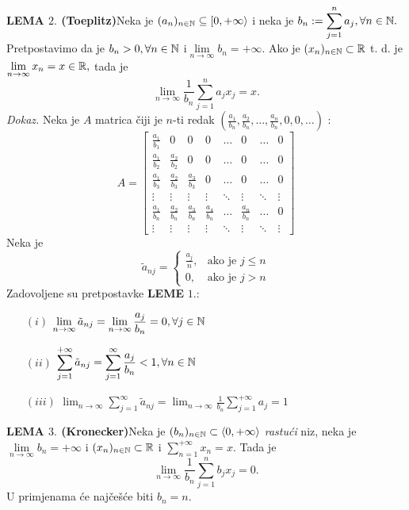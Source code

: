 \documentclass{article}
\begin{document}
\textbf{LEMA \(2.\) (Toeplitz)}\newline Neka je \((a_n)_{n\in\Bbb N}\subseteq[0,+\infty\rangle\) i neka je \(\displaystyle b_n:=\sum_{j=1}^na_j,\forall n\in\Bbb N.\) Pretpostavimo da je \(b_n>0,\forall n\in\Bbb N\) i\newline \(\lim\limits_{n\to\infty}b_n=+\infty.\) Ako je \((x_n)_{n\in\Bbb N}\subset\Bbb R\) t. d. je \(\lim\limits_{n\to\infty}x_n=x\in\Bbb R,\) tada je \[\lim_{n\to\infty}\frac1{b_n}\sum_{j=1}^na_jx_j=x.\]  
\textit{Dokaz.}\newline
Neka je \(A\) matrica čiji je \(n\)-ti redak \(\left(\frac{a_1}{b_n},\frac{a_2}{b_n},\ldots,\frac{a_n}{b_n},0,0,\ldots\right)\) : \[A=\begin{bmatrix}\frac{a_1}{b_1}&0&0&0&\ldots&0&\ldots&0\\\frac{a_1}{b_2}&\frac{a_2}{b_2}&0&0&\ldots&0&\ldots&0\\\frac{a_1}{b_3}&\frac{a_2}{b_3}&\frac{a_3}{b_3}&0&\ldots&0&\ldots&0\\\vdots&\vdots&\vdots&\vdots&\ddots&\vdots&\ddots&\vdots\\\frac{a_1}{b_n}&\frac{a_2}{b_n}&\frac{a_3}{b_n}&\frac{a_4}{b_n}&\ldots&\frac{a_n}{b_n}&\ldots&0\\\vdots&\vdots&\vdots&\vdots&\ddots&\vdots&\ddots&\vdots\end{bmatrix}\] Neka je \[\tilde a_{nj}=\begin{cases}\frac{a_j}n,&\text{ako je }j\le n\\0,&\text{ako je }j>n\end{cases}\]
Zadovoljene su pretpostavke \textbf{LEME} \(1.\):
\begin{enumerate}
    \item[\((i)\)] \(\displaystyle\lim_{n\to\infty}\tilde a_{nj}=\lim_{n\to\infty}\frac{a_j}{b_n}=0,\forall j\in\Bbb N\)
    \item[\((ii)\)] \(\displaystyle\sum_{j=1}^{+\infty}\tilde a_{nj}=\sum_{j=1}^\infty\frac{a_j}{b_n}<1,\forall n\in\Bbb N\)
    \item[\((iii)\)] \(\displaystyle\lim_{n\to\infty}\sum_{j=1}^\infty\tilde a_{nj}=\lim_{n\to\infty}\frac1{b_n}\sum_{j=1}^{+\infty}a_j=1\)
\end{enumerate}
\textbf{LEMA \(3.\) (Kronecker)}\newline Neka je \((b_n)_{n\in\Bbb N}\subset\langle 0,+\infty\rangle\) \emph{rastući} niz, neka je \(\lim\limits_{n\to\infty}b_n=+\infty\) i \((x_n)_{n\in\Bbb N}\subset\Bbb R\) i \(\displaystyle\sum_{n=1}^{+\infty}x_n=x.\) Tada je \[\lim_{n\to\infty}\frac1{b_n}\sum_{j=1}^nb_jx_j=0.\] U primjenama će najčešće biti \(b_n=n.\)\newline\newline
\end{document}
